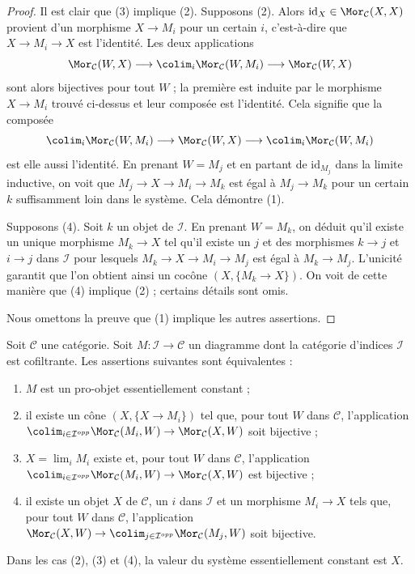 \begin{proof}
Il est clair que (3) implique (2). Supposons (2). Alors
$\text{id}_X \in \Mor_\mathcal{C}(X, X)$ provient d'un morphisme
$X \to M_i$ pour un certain $i$, c'est-à-dire que $X \to M_i \to X$ est
l'identité. Les deux applications
$$
\Mor_\mathcal{C}(W, X)
\longrightarrow
\colim_i \Mor_\mathcal{C}(W, M_i)
\longrightarrow
\Mor_\mathcal{C}(W, X)
$$
sont alors bijectives pour tout $W$ ; la première est induite par le morphisme
$X \to M_i$ trouvé ci-dessus et leur composée est l'identité. Cela signifie
que la composée
$$
\colim_i \Mor_\mathcal{C}(W, M_i)
\longrightarrow
\Mor_\mathcal{C}(W, X)
\longrightarrow
\colim_i \Mor_\mathcal{C}(W, M_i)
$$
est elle aussi l'identité. En prenant $W = M_j$ et en partant de
$\text{id}_{M_j}$ dans la limite inductive, on voit que
$M_j \to X \to M_i \to M_k$ est égal à $M_j \to M_k$ pour un certain $k$
suffisamment loin dans le système. Cela démontre (1).

\medskip\noindent
Supposons (4). Soit $k$ un objet de $\mathcal{I}$. En prenant $W = M_k$,
on déduit qu'il existe un unique morphisme $M_k \to X$ tel qu'il existe un
$j$ et des morphismes $k \to j$ et $i \to j$ dans $\mathcal{I}$ pour lesquels
$M_k \to X \to M_i \to M_j$ est égal à $M_k \to M_j$. L'unicité garantit
que l'on obtient ainsi un cocône $(X, \{M_k \to X\})$. On voit de cette
manière que (4) implique (2) ; certains détails sont omis.

\medskip\noindent
Nous omettons la preuve que (1) implique les autres assertions.
\end{proof}

\begin{lemma}
\label{lemma-characterize-essentially-constant-pro}
Soit $\mathcal{C}$ une catégorie. Soit $M : \mathcal{I} \to \mathcal{C}$
un diagramme dont la catégorie d'indices $\mathcal{I}$ est cofiltrante.
Les assertions suivantes sont équivalentes :
\begin{enumerate}
\item $M$ est un pro-objet essentiellement constant ;
\item il existe un cône $(X, \{X \to M_i\})$ tel que, pour tout $W$ dans
$\mathcal{C}$, l'application
$\colim_{i \in \mathcal{I}^{opp}} \Mor_\mathcal{C}(M_i, W) \to
\Mor_\mathcal{C}(X, W)$ soit bijective ;
\item $X = \lim_i M_i$ existe et, pour tout $W$ dans $\mathcal{C}$,
l'application
$\colim_{i \in \mathcal{I}^{opp}} \Mor_\mathcal{C}(M_i, W) \to
\Mor_\mathcal{C}(X, W)$ est bijective ;
\item il existe un objet $X$ de $\mathcal{C}$, un $i$ dans $\mathcal{I}$ et un
morphisme $M_i \to X$ tels que, pour tout $W$ dans $\mathcal{C}$, l'application
$\Mor_\mathcal{C}(X, W) \to
\colim_{j \in \mathcal{I}^{opp}} \Mor_\mathcal{C}(M_j, W)$ soit bijective.
\end{enumerate}
Dans les cas (2), (3) et (4), la valeur du système essentiellement constant
est $X$.
\end{lemma}

